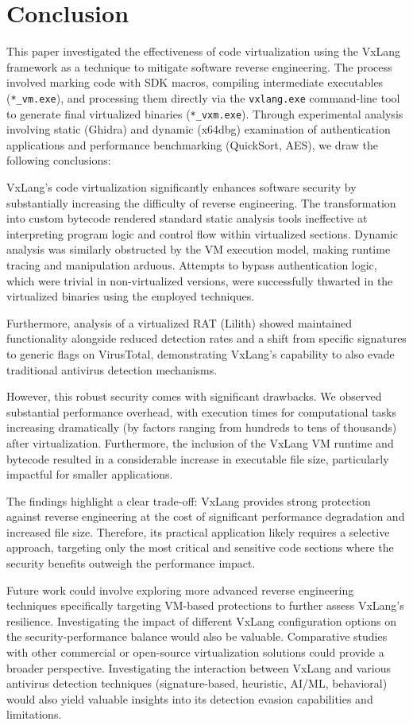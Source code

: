 \section{Conclusion} \label{sec:conclusion}
This paper investigated the effectiveness of code virtualization using the VxLang framework as a technique to mitigate software reverse engineering. The process involved marking code with SDK macros, compiling intermediate executables (\texttt{*\_vm.exe}), and processing them directly via the \texttt{vxlang.exe} command-line tool to generate final virtualized binaries (\texttt{*\_vxm.exe}). Through experimental analysis involving static (Ghidra) and dynamic (x64dbg) examination of authentication applications and performance benchmarking (QuickSort, AES), we draw the following conclusions:

VxLang's code virtualization significantly enhances software security by substantially increasing the difficulty of reverse engineering. The transformation into custom bytecode rendered standard static analysis tools ineffective at interpreting program logic and control flow within virtualized sections. Dynamic analysis was similarly obstructed by the VM execution model, making runtime tracing and manipulation arduous. Attempts to bypass authentication logic, which were trivial in non-virtualized versions, were successfully thwarted in the virtualized binaries using the employed techniques.

Furthermore, analysis of a virtualized RAT (Lilith) showed maintained functionality alongside reduced detection rates and a shift from specific signatures to generic flags on VirusTotal, demonstrating VxLang's capability to also evade traditional antivirus detection mechanisms.

However, this robust security comes with significant drawbacks. We observed substantial performance overhead, with execution times for computational tasks increasing dramatically (by factors ranging from hundreds to tens of thousands) after virtualization. Furthermore, the inclusion of the VxLang VM runtime and bytecode resulted in a considerable increase in executable file size, particularly impactful for smaller applications.

The findings highlight a clear trade-off: VxLang provides strong protection against reverse engineering at the cost of significant performance degradation and increased file size. Therefore, its practical application likely requires a selective approach, targeting only the most critical and sensitive code sections where the security benefits outweigh the performance impact.

Future work could involve exploring more advanced reverse engineering techniques specifically targeting VM-based protections to further assess VxLang's resilience. Investigating the impact of different VxLang configuration options on the security-performance balance would also be valuable. Comparative studies with other commercial or open-source virtualization solutions could provide a broader perspective. Investigating the interaction between VxLang and various antivirus detection techniques (signature-based, heuristic, AI/ML, behavioral) would also yield valuable insights into its detection evasion capabilities and limitations.
